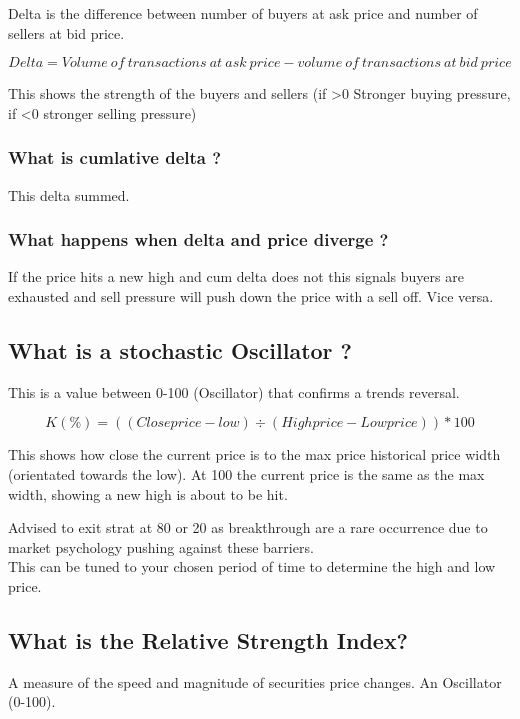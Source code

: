 \documentclass[11pt]{scrartcl} %
\begin{document}
Delta is the difference between number of buyers at ask price and number of sellers at bid price.

\[ Delta = Volume\:of\:transactions\:at\:ask\:price - volume\:of\:transactions\:at\:bid\:price \]

This shows the strength of the buyers and sellers (if >0 Stronger buying pressure, if <0 stronger 
selling pressure)

\subsubsection{What is cumlative delta ?}

This delta summed.

\subsubsection{What happens when delta and price diverge ?}

If the price hits a new high and cum delta does not this signals buyers are exhausted and sell pressure will
push down the price with a sell off. Vice versa.

\subsection{What is a stochastic Oscillator ?}

This is a value between 0-100 (Oscillator) that confirms a trends reversal.

\[ K(\%) = ((Close price - low) \div (High price - Low price)) * 100\] 

This shows how close the current price is to the max price historical price width (orientated towards the low).
At 100 the current price is the same as the max width, showing a new high is about to be hit.

Advised to exit strat at 80 or 20 as breakthrough are a rare occurrence due to market psychology pushing
against these barriers.\\

This can be tuned to your chosen period of time to determine the high and low price.

\subsection{What is the Relative Strength Index?}

A measure of the speed and magnitude of securities price changes. An Oscillator (0-100).
\end{document}
